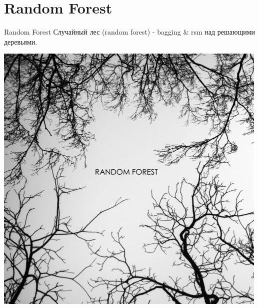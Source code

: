 \documentclass[10pt]{beamer}
\begin{document}
\section{Random Forest}

\begin{frame}{Random Forest}
Случайный лес (random forest) - bagging \& rsm над решающими деревьями.
\begin{center}
    \includegraphics[scale=0.3]{images/rf.jpg}
\end{center}
\end{frame}
\end{document}
